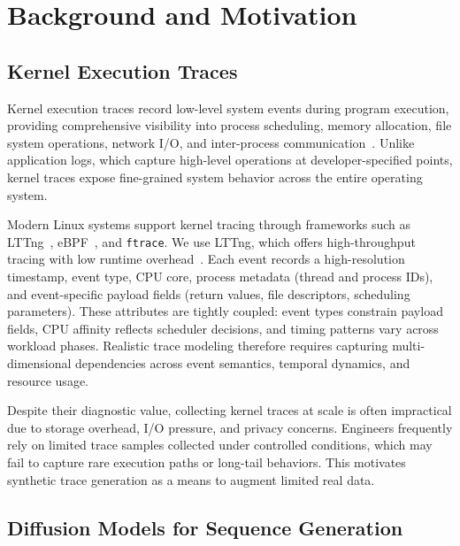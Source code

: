 \section{Background and Motivation}
\label{sec:background}

\subsection{Kernel Execution Traces}
\label{sec:bg-traces}

Kernel execution traces record low-level system events during program execution, providing comprehensive visibility into process scheduling, memory allocation, file system operations, network I/O, and inter-process communication~\cite{Noferesti2024Enhancing, Njoku2025Kernel-Level, Giraldeau2016Wait, Gebai2018Survey, Naas2021EZIOTracer, Gellé2021Combining}. Unlike application logs, which capture high-level operations at developer-specified points, kernel traces expose fine-grained system behavior across the entire operating system.

Modern Linux systems support kernel tracing through frameworks such as LTTng~\cite{Desnoyers2006The, Beamonte2015Linux}, eBPF~\cite{eBPF}, and \texttt{ftrace}. We use LTTng, which offers high-throughput tracing with low runtime overhead~\cite{Desnoyers2006The}. Each event records a high-resolution timestamp, event type, CPU core, process metadata (thread and process IDs), and event-specific payload fields (return values, file descriptors, scheduling parameters). These attributes are tightly coupled: event types constrain payload fields, CPU affinity reflects scheduler decisions, and timing patterns vary across workload phases. Realistic trace modeling therefore requires capturing multi-dimensional dependencies across event semantics, temporal dynamics, and resource usage.

Despite their diagnostic value, collecting kernel traces at scale is often impractical due to storage overhead, I/O pressure, and privacy concerns. Engineers frequently rely on limited trace samples collected under controlled conditions, which may fail to capture rare execution paths or long-tail behaviors. This motivates synthetic trace generation as a means to augment limited real data.

\subsection{Diffusion Models for Sequence Generation}
\label{sec:bg-diffusion}

